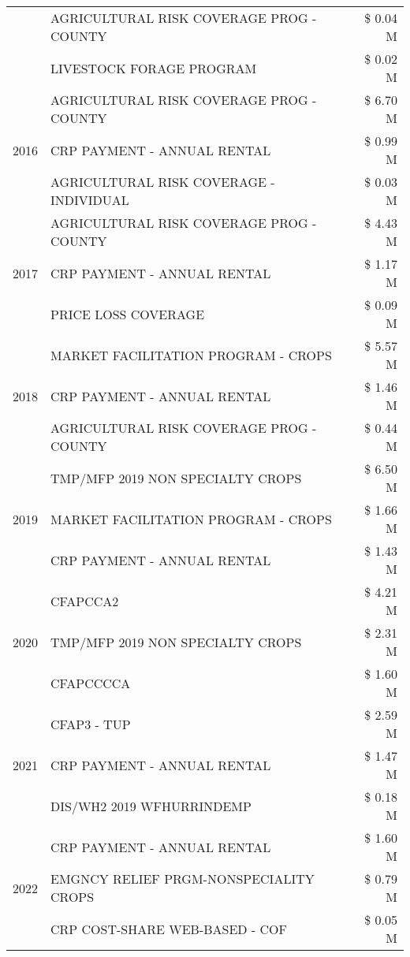 \begin{tabular}{llr}
 & AGRICULTURAL RISK COVERAGE PROG - COUNTY & \$ 0.04 M \\
 & LIVESTOCK FORAGE PROGRAM & \$ 0.02 M \\
\cline{1-3}
\multirow[t]{3}{*}{2016} & AGRICULTURAL RISK COVERAGE PROG - COUNTY & \$ 6.70 M \\
 & CRP PAYMENT - ANNUAL RENTAL & \$ 0.99 M \\
 & AGRICULTURAL RISK COVERAGE - INDIVIDUAL & \$ 0.03 M \\
\cline{1-3}
\multirow[t]{3}{*}{2017} & AGRICULTURAL RISK COVERAGE PROG - COUNTY & \$ 4.43 M \\
 & CRP PAYMENT - ANNUAL RENTAL & \$ 1.17 M \\
 & PRICE LOSS COVERAGE & \$ 0.09 M \\
\cline{1-3}
\multirow[t]{3}{*}{2018} & MARKET FACILITATION PROGRAM - CROPS & \$ 5.57 M \\
 & CRP PAYMENT - ANNUAL RENTAL & \$ 1.46 M \\
 & AGRICULTURAL RISK COVERAGE PROG - COUNTY & \$ 0.44 M \\
\cline{1-3}
\multirow[t]{3}{*}{2019} & TMP/MFP 2019 NON SPECIALTY CROPS & \$ 6.50 M \\
 & MARKET FACILITATION PROGRAM - CROPS & \$ 1.66 M \\
 & CRP PAYMENT - ANNUAL RENTAL & \$ 1.43 M \\
\cline{1-3}
\multirow[t]{3}{*}{2020} & CFAPCCA2 & \$ 4.21 M \\
 & TMP/MFP 2019 NON SPECIALTY CROPS & \$ 2.31 M \\
 & CFAPCCCCA & \$ 1.60 M \\
\cline{1-3}
\multirow[t]{3}{*}{2021} & CFAP3 - TUP & \$ 2.59 M \\
 & CRP PAYMENT - ANNUAL RENTAL & \$ 1.47 M \\
 & DIS/WH2 2019 WFHURRINDEMP & \$ 0.18 M \\
\cline{1-3}
\multirow[t]{3}{*}{2022} & CRP PAYMENT - ANNUAL RENTAL & \$ 1.60 M \\
 & EMGNCY RELIEF PRGM-NONSPECIALITY CROPS & \$ 0.79 M \\
 & CRP COST-SHARE WEB-BASED - COF & \$ 0.05 M \\
\cline{1-3}
\bottomrule
\end{tabular}
